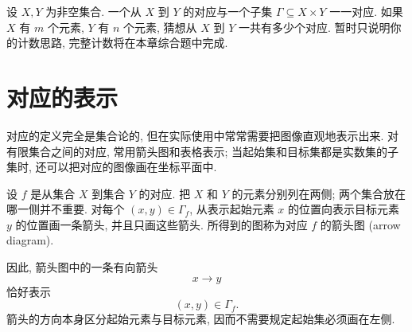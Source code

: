 \documentclass[usesamecnt, thmcnt=section, lang=cn, newtx, 10pt, scheme=chinese]{elegantbook}
\begin{document}
\begin{challenge}\label{ch:corr-01}
设 $X,Y$ 为非空集合. 一个从 $X$ 到 $Y$ 的对应与一个子集 $\Gamma\subseteq X\times Y$ 一一对应. 如果 $X$ 有 $m$ 个元素, $Y$ 有 $n$ 个元素, 猜想从 $X$ 到 $Y$ 一共有多少个对应. 暂时只说明你的计数思路, 完整计数将在本章综合题中完成.
\end{challenge}

\section{对应的表示}

对应的定义完全是集合论的, 但在实际使用中常常需要把图像直观地表示出来. 对有限集合之间的对应, 常用箭头图和表格表示; 当起始集和目标集都是实数集的子集时, 还可以把对应的图像画在坐标平面中.

\begin{definition}[箭头图]\label{def:corr-arrow-diagram}
设 $f$ 是从集合 $X$ 到集合 $Y$ 的对应. 把 $X$ 和 $Y$ 的元素分别列在两侧; 两个集合放在哪一侧并不重要. 对每个 $(x,y)\in\Gamma_f$, 从表示起始元素 $x$ 的位置向表示目标元素 $y$ 的位置画一条箭头, 并且只画这些箭头. 所得到的图称为对应 $f$ 的{\color{blue}箭头图 (arrow diagram)}.

因此, 箭头图中的一条有向箭头
\[
 x\longrightarrow y
\]
恰好表示
\[
 (x,y)\in\Gamma_f.
\]
箭头的方向本身区分起始元素与目标元素, 因而不需要规定起始集必须画在左侧.
\end{definition}
\end{document}
